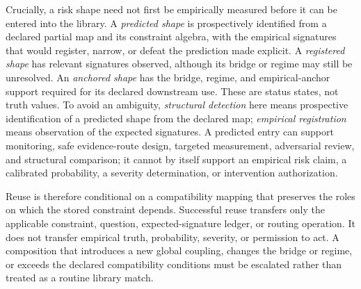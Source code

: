 \documentclass[11pt]{article}
\begin{document}
Crucially, a risk shape need not first be empirically measured before it can be entered into the library. A \emph{predicted shape} is prospectively identified from a declared partial map and its constraint algebra, with the empirical signatures that would register, narrow, or defeat the prediction made explicit. A \emph{registered shape} has relevant signatures observed, although its bridge or regime may still be unresolved. An \emph{anchored shape} has the bridge, regime, and empirical-anchor support required for its declared downstream use. These are status states, not truth values. To avoid an ambiguity, \emph{structural detection} here means prospective identification of a predicted shape from the declared map; \emph{empirical registration} means observation of the expected signatures. A predicted entry can support monitoring, safe evidence-route design, targeted measurement, adversarial review, and structural comparison; it cannot by itself support an empirical risk claim, a calibrated probability, a severity determination, or intervention authorization.

Reuse is therefore conditional on a compatibility mapping that preserves the roles on which the stored constraint depends. Successful reuse transfers only the applicable constraint, question, expected-signature ledger, or routing operation. It does not transfer empirical truth, probability, severity, or permission to act. A composition that introduces a new global coupling, changes the bridge or regime, or exceeds the declared compatibility conditions must be escalated rather than treated as a routine library match.
\end{document}
